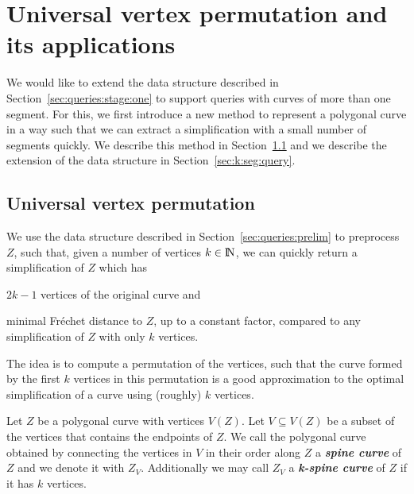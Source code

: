\documentclass[12pt]{article}
\newcommand{\seclab}[1]{\label{sec:#1}}
\newcommand{\secref}[1]{Section~\ref{sec:#1}}
\newcommand{\emphic}[2]{\textcolor{blue25}{\textbf{\emph{#1}}}\index{#2}}
\newcommand{\emphi}[1]{\emphic{#1}{#1}}
\newcommand{\Frechet}{Fr\'{e}c{h}e{}t\xspace}\providecommand{\Arr}{\mathop{\mathrm{\EuScript{A}}}}
\newcommand{\cZ}{{Z}}
\providecommand{\pth}[2][\!]{#1\left({#2}\right)}
\newcommand{\SpCrv}[2]{{#1}_{#2}}
\newcommand{\VertexSet}[1]{{V}\pth{#1}}
\newcommand{\VtxSet}{{V}}
\newcommand{\Na}{{\rm I\!\hspace{-0.025em} N}}
\newcommand{\SNumVertices}[1]{2#1 - 1}
\numberwithin{figure}{section}
\numberwithin{equation}{section}
\begin{document}
\section{Universal vertex permutation and its applications}
\seclab{f:r:simpl}


We would like to extend the data structure described in
\secref{queries:stage:one} to support queries with curves of more than
one segment. For this, we first introduce a new method to represent a
polygonal curve in a way such that we can extract a simplification
with a small number of segments quickly. We describe this method in
\secref{u:simpl} and we describe the extension of the data structure
in \secref{k:seg:query}.


\subsection{Universal vertex permutation}
\seclab{u:simpl}

We use the data structure described in \secref{queries:prelim} to
preprocess $\cZ$, such that, given a number of vertices $k \in \Na$,
we can quickly return a simplification of $\cZ$ which has
\begin{compactenum}[(i)]
    \item $\SNumVertices{k}$ vertices of the original curve and
    \item minimal \Frechet distance to $\cZ$, up to a constant factor,
    compared to any simplification of $\cZ$ with only $k$ vertices.
\end{compactenum}
The idea is to compute a permutation of the vertices, such that the
curve formed by the first $k$ vertices in this permutation is a good
approximation to the optimal simplification of a curve using (roughly)
$k$ vertices.


\begin{defn}
    Let $\cZ$ be a polygonal curve with vertices
    $\VertexSet{\cZ}$. Let $\VtxSet \subseteq \VertexSet{\cZ}$ be a
    subset of the vertices that contains the endpoints of $\cZ$.  We
    call the polygonal curve obtained by connecting the vertices in
    $\VtxSet$ in their order along $\cZ$ a \emphi{spine curve} of
    $\cZ$ and we denote it with $\SpCrv{\cZ}{\VtxSet}$. Additionally
    we may call $\SpCrv{\cZ}{\VtxSet}$ a \emphi{k-spine curve} of
    $\cZ$ if it has $k$ vertices.
\end{defn}
\end{document}
